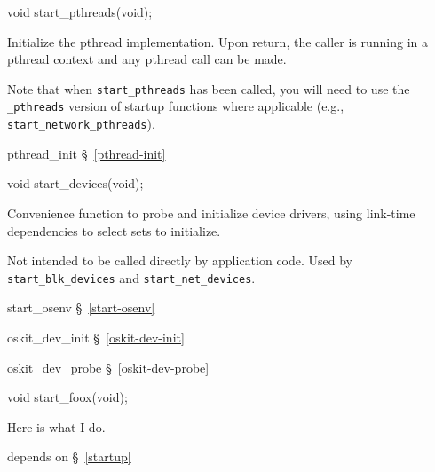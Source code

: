 \label{start-pthreads}
\begin{apisyn}

	\funcproto void start_pthreads(void);
\end{apisyn}
\begin{apidesc}
	Initialize the pthread implementation.
	Upon return, the caller is running in a pthread context and
	any pthread call can be made.

	Note that when \texttt{start_pthreads} has been called, you
	will need to use the \texttt{_pthreads} version of startup
	functions where applicable (e.g., \texttt{start_network_pthreads}).
\end{apidesc}
\begin{apidep}
	\item[pthread_init]	\S~\ref{pthread-init}
\end{apidep}

\label{start-devices}
\begin{apisyn}

	\funcproto void start_devices(void);
\end{apisyn}
\begin{apidesc}
	Convenience function to probe and initialize device drivers,
	using link-time dependencies to select sets to initialize.

	Not intended to be called directly by application code.
	Used by \texttt{start_blk_devices} and \texttt{start_net_devices}.
\end{apidesc}
\begin{apidep}
	\item[start_osenv]	\S~\ref{start-osenv}
	\item[oskit_dev_init]	\S~\ref{oskit-dev-init}
	\item[oskit_dev_probe]	\S~\ref{oskit-dev-probe}
\end{apidep}


\label{start-foox}
\begin{apisyn}

	\funcproto void start_foox(void);
\end{apisyn}
\begin{apidesc}
	Here is what I do.
\end{apidesc}
\begin{apidep}
	\item[depends on]	\S~\ref{startup}
\end{apidep}


